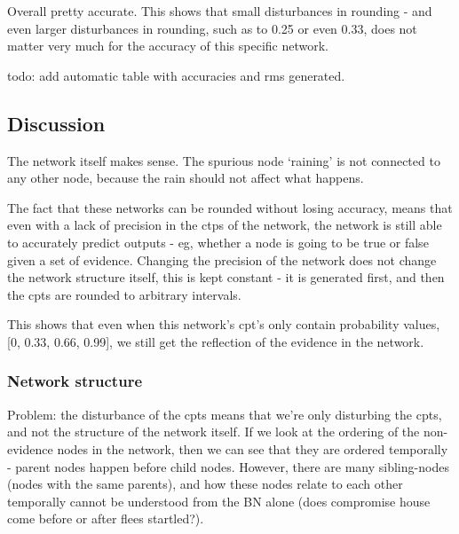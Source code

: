 


Overall pretty accurate. This shows that small disturbances in rounding - and even larger disturbances in rounding, such as to 0.25 or even 0.33, does not matter very much for the accuracy of this specific network. 

{\color{red} todo: add automatic table with accuracies and rms generated}.


\subsection{Discussion}

The network itself makes sense. The spurious node `raining' is not connected to any other node, because the rain should not affect what happens.

The fact that these networks can be rounded without losing accuracy, means that even with a lack of precision in the ctps of the network, the network is still able to accurately predict outputs - eg, whether a node is going to be true or false given a set of evidence. Changing the precision of the network does not change the network structure itself, this is kept constant - it is generated first, and then the cpts are rounded to arbitrary intervals. 

This shows that even when this network's cpt's only contain probability values, [0, 0.33, 0.66, 0.99], we still get the reflection of the evidence in the network. 

\subsubsection{Network structure}

Problem: the disturbance of the cpts means that we're only disturbing the cpts, and not the structure of the network itself. If we look at the ordering of the non-evidence nodes in the network, then we can see that they are ordered temporally - parent nodes happen before child nodes. However, there are many sibling-nodes (nodes with the same parents), and how these nodes relate to each other temporally cannot be understood from the BN alone (does compromise house come before or after flees startled?). 

